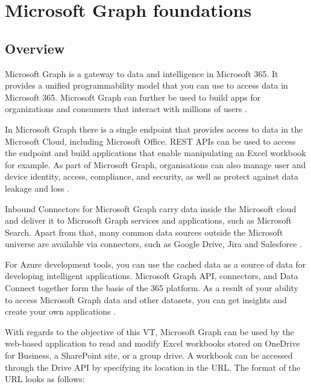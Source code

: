 
\chapter{Microsoft Graph foundations} %

\label{Chapter2} %


\section{Overview}

Microsoft Graph is a gateway to data and intelligence in Microsoft 365. It provides a unified programmability model that you can use to access data in Microsoft 365. Microsoft Graph can further be used to build apps for organizations and consumers that interact with millions of users \cite{MSGraphOverview} .

In Microsoft Graph there is a single endpoint that provides access to data in the Microsoft Cloud, including Microsoft Office. REST APIs can be used to access the endpoint and build applications that enable manipulating an Excel workbook for example. As part of Microsoft Graph, organisations can also manage user and device identity, access, compliance, and security, as well as protect against data leakage and loss \cite{MSGraphOverview}.

Inbound Connectors for Microsoft Graph carry data inside the Microsoft cloud and deliver it to Microsoft Graph services and applications, such as Microsoft Search. Apart from that, many common data sources outside the Microsoft universe are available via connectors, such as Google Drive, Jira and Salesforce \cite{MSGraphOverview}.

For Azure development tools, you can use the cached data as a source of data for developing intelligent applications.
Microsoft Graph API, connectors, and Data Connect together form the basis of the 365 platform. As a result of your ability to access Microsoft Graph data and other datasets, you can get insights and create your own applications \cite{MSGraphOverview}.


With regards to the objective of this VT, Microsoft Graph can be used by the web-based application to read and modify Excel workbooks stored on OneDrive for Business, a SharePoint site, or a group drive. A workbook can be accessed through the Drive API by specifying its location in the URL. The format of the URL looks as follows:
\\

